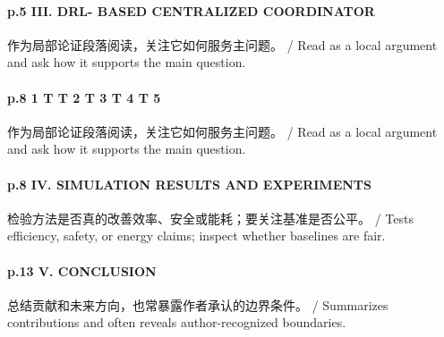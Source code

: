 \documentclass[UTF8,a4paper,11pt,fontset=fandol]{ctexart}
\begin{document}
\paragraph{p.5 III. DRL- BASED CENTRALIZED COORDINATOR}作为局部论证段落阅读，关注它如何服务主问题。 / Read as a local argument and ask how it supports the main question.

\paragraph{p.8 1 T T 2 T 3 T 4 T 5}作为局部论证段落阅读，关注它如何服务主问题。 / Read as a local argument and ask how it supports the main question.

\paragraph{p.8 IV. SIMULATION RESULTS AND EXPERIMENTS}检验方法是否真的改善效率、安全或能耗；要关注基准是否公平。 / Tests efficiency, safety, or energy claims; inspect whether baselines are fair.

\paragraph{p.13 V. CONCLUSION}总结贡献和未来方向，也常暴露作者承认的边界条件。 / Summarizes contributions and often reveals author-recognized boundaries.
\end{document}
